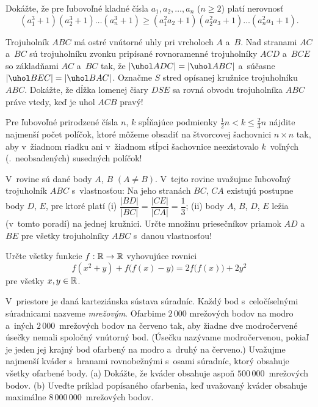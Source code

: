 {%
Dokážte, že pre ľubovoľné kladné čísla $a_1,a_2,\dots ,
  a_n$ ($n\ge 2$) platí nerovnosť
$$
(a_1^3+1)(a_2^3+1)\dots (a_n^3+1)\geq (a_1^2a_2+1)(a_2^2a_3+1)\dots
    (a_n^2a_1+1).
$$}

{%
Trojuholník $ABC$ má ostré vnútorné uhly pri vrcholoch $A$ a~$B$.
Nad stranami $AC$ a~$BC$ sú trojuholníku zvonku pripísané
rovnoramenné trojuholníky $AC\!D$ a~$BC\!E$ so základňami $AC$
a~$BC$ tak, že $|\uhol ADC|=|\uhol ABC|$ a~súčasne $|\uhol
BEC|=|\uhol BAC|$. Označme $S$ stred opísanej kružnice
trojuholníku $ABC$. Dokážte, že dĺžka lomenej čiary $DSE$ sa rovná
obvodu trojuholníka $ABC$ práve vtedy, keď je uhol $AC\!B$ pravý!}

{%
Pre ľubovoľné prirodzené čísla $n$, $k$ spĺňajúce podmienky
$\frac12n<k\leq \frac23n$ nájdite najmenší počet políčok, ktoré môžeme
obsadiť na štvorcovej šachovnici $n\times n$ tak, aby v~žiadnom
riadku ani v~žiadnom stĺpci šachovnice neexistovalo $k$~voľných
(\tj.~neobsadených) susedných políčok!}

{%
V~rovine sú dané body $A$, $B$ $(A\ne B)$. V~tejto
  rovine uvažujme ľubovoľný trojuholník $ABC$ s~vlastnosťou: Na jeho
  stranách $BC$, $C\!A$ existujú postupne body $D$, $E$, pre ktoré platí
\ite (i) $\dfrac{|BD|}{|BC|}=\dfrac{|CE|}{|CA|}=\dfrac13$;
\ite (ii) body $A$, $B$, $D$, $E$ ležia (v~tomto poradí) na
          jednej kružnici.
  Určte množinu priesečníkov priamok $AD$ a~$BE$ pre všetky trojuholníky
  $ABC$ s~danou vlastnosťou!}

{%
Určte všetky funkcie $f:\Bbb R \to \Bbb R$ vyhovujúce rovnici
$$
f(x^2+y)+f\bigl(f(x)-y\bigr)=2f\bigl(f(x)\bigr)+2y^2
$$
  pre všetky $x,y\in \Bbb R$.}

{%
V~priestore je daná karteziánska sústava súradníc. Každý bod
s~celočíselnými súradnicami nazveme {\it mrežovým}. Ofarbime
$2\,000$ mrežových bodov na modro a~iných $2\,000$~mrežových bodov
na červeno tak, aby žiadne dve modročervené úsečky nemali spoločný
vnútorný bod. (Úsečku nazývame modročervenou, pokiaľ je jeden jej
krajný bod ofarbený na modro a~druhý na červeno.) Uvažujme najmenší
kváder s~hranami rovnobežnými s~osami súradníc, ktorý
obsahuje všetky ofarbené body.
\ite (a) Dokážte, že kváder obsahuje aspoň
         $500\,000$~mrežových bodov.
\ite (b) Uveďte príklad popísaného ofarbenia, keď uvažovaný
         kváder obsahuje maximálne $8\,000\,000$~mrežových bodov.
}

